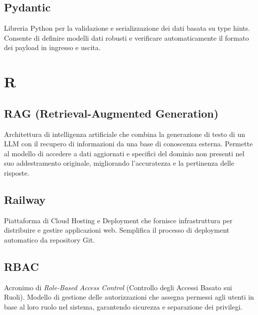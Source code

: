\documentclass[a4paper, 11pt, oneside]{scrartcl} %
\begin{document}
\vspace{0.5cm}

\subsection*{Pydantic}
Libreria Python per la validazione e serializzazione dei dati basata su type hints. Consente di definire modelli dati robusti e verificare automaticamente il formato dei payload in ingresso e uscita.
\vspace{0.5cm}



\section*{R}


\subsection*{RAG (Retrieval-Augmented Generation)}
Architettura di intelligenza artificiale che combina la generazione di testo di un LLM con il recupero di informazioni da una base di conoscenza esterna. Permette al modello di accedere a dati aggiornati e specifici del dominio non presenti nel suo addestramento originale, migliorando l'accuratezza e la pertinenza delle risposte.
\vspace{0.5cm}

\subsection*{Railway}


Piattaforma di Cloud Hosting e Deployment che fornisce infrastruttura per distribuire e gestire applicazioni web. Semplifica il processo di deployment automatico da repository Git.

\vspace{0.5cm}

\subsection*{RBAC}


Acronimo di \textit{Role-Based Access Control} (Controllo degli Accessi Basato sui Ruoli). Modello di gestione delle autorizzazioni che assegna permessi agli utenti in base al loro ruolo nel sistema, garantendo sicurezza e separazione dei privilegi.
\end{document}
